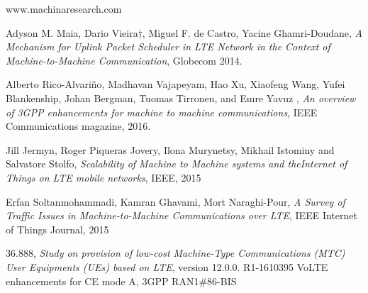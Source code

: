 \documentclass[conference,compsoc]{IEEEtran}
\begin{document}


%
%
%
\begin{thebibliography}{1}

www.machinaresearch.com

Adyson M. Maia, Dario Vieira†, Miguel F. de Castro, Yacine Ghamri-Doudane, \emph{A Mechanism for Uplink Packet Scheduler in LTE Network in the Context of Machine-to-Machine Communication},  Globecom 2014.

Alberto Rico-Alvariño, Madhavan Vajapeyam, Hao Xu, Xiaofeng Wang, Yufei Blankenship, Johan Bergman, Tuomas Tirronen, and Emre Yavuz , \emph{An overview of 3GPP enhancements for machine to machine communications}, IEEE Communications magazine, 2016.

    Jill Jermyn, Roger Piqueras Jovery, Ilona Murynetsy, Mikhail Istominy and Salvatore Stolfo, \emph{Scalability of Machine to Machine systems and theInternet of Things on LTE mobile networks}, IEEE, 2015

    Erfan Soltanmohammadi, Kamran Ghavami, Mort Naraghi-Pour, \emph{A Survey of Traffic Issues in Machine-to-Machine Communications over LTE}, IEEE Internet of Things Journal, 2015

    36.888, \emph{Study on provision of low-cost Machine-Type Communications (MTC) User Equipments (UEs) based on LTE}, version 12.0.0.
    R1-1610395 VoLTE enhancements for CE mode A, 3GPP RAN1\#86-BIS

\end{thebibliography}




\end{document}
